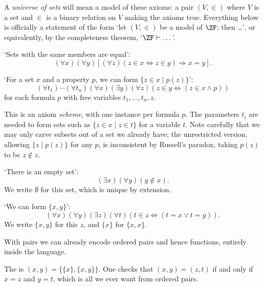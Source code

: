 A \emph{universe of sets} will mean a model of these axioms: a pair $(V, \in)$ where $V$ is a set and $\in$ is a binary relation on $V$ making the axioms true. Everything below is officially a statement of the form `let $(V, \in)$ be a model of $\ZF$; then \dots', or equivalently, by the completeness theorem, `$\ZF \vdash \dots$'.

\begin{axiom}[Extension]
  `Sets with the same members are equal':
  $$
  (\forall x)(\forall y)[(\forall z)(z \in x \Leftrightarrow z \in y) \Rightarrow x = y].
  $$
\end{axiom}

\begin{axiom}[Separation]
`For a set $x$ and a property $p$, we can form $\{z \in x \mid p(z)\}$':
$$
(\forall t_1)\cdots (\forall t_n) (\forall x)(\exists y)(\forall z)(z \in y \Leftrightarrow (z \in x \land p))
$$
for each formula $p$ with free variables $t_1, \dots, t_n, z$.
\end{axiom}

This is an axiom \emph{scheme}, with one instance per formula $p$. The parameters $t_i$ are needed to form sets such as $\{z \in x \mid z \in t\}$ for a variable $t$. Note carefully that we may only carve subsets out of a set we already have; the unrestricted version, allowing $\{z \mid p(z)\}$ for any $p$, is inconsistent by Russell's paradox, taking $p(z)$ to be $z \notin z$.

\begin{axiom}
  `There is an empty set':
  $$
  (\exists x) (\forall y)(y \notin x).
  $$
  We write $\emptyset$ for this set, which is unique by extension.
\end{axiom}

\begin{axiom}
  `We can form $\{x, y\}$':
  $$
(\forall x)(\forall y)(\exists z)(\forall t)(t \in z \Leftrightarrow (t = x \lor t = y)).
  $$
  We write $\{x, y\}$ for this $z$, and $\{x\}$ for $\{x, x\}$.
\end{axiom}

With pairs we can already encode ordered pairs and hence functions, entirely inside the language.

\begin{definition}
  The  is $(x, y) = \{\{x\}, \{x, y\}\}$. One checks that $(x, y) = (z, t)$ if and only if $x = z$ and $y = t$, which is all we ever want from ordered pairs.
\end{definition}

